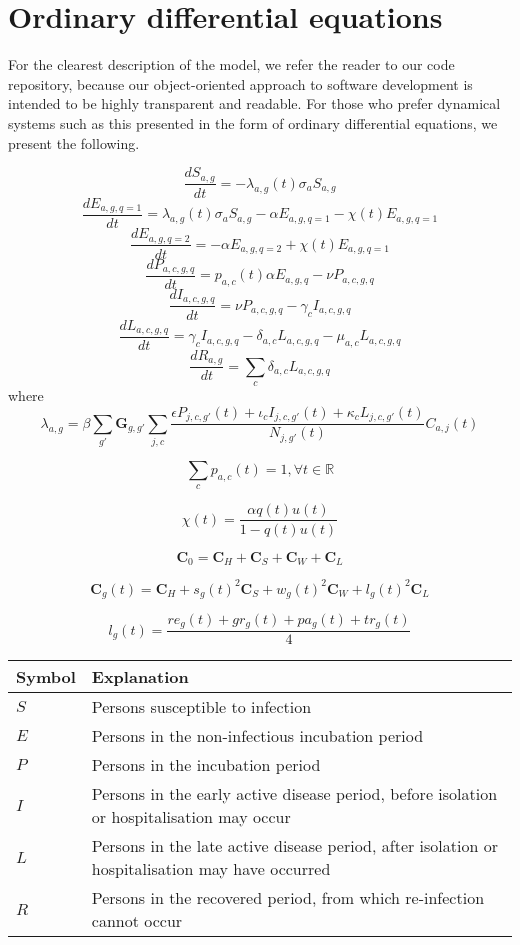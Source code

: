 
\section{Ordinary differential equations}

For the clearest description of the model, we refer the reader to our code repository, because our object-oriented approach to software development is intended to be highly transparent and readable. For those who prefer dynamical systems such as this presented in the form of ordinary differential equations, we present the following.

\[\frac{dS_{a,g}}{dt}=-\lambda_{a,g}(t) \sigma_{a} S_{a,g}\]
\[\frac{dE_{a,g,q=1}}{dt}=\lambda_{a,g}(t) \sigma_{a} S_{a,g} -\alpha E_{a,g,q=1} - \chi(t) E_{a,g,q=1} \]
\[\frac{dE_{a,g,q=2}}{dt}=-\alpha E_{a,g,q=2} + \chi(t) E_{a,g,q=1} \]
\[\frac{dP_{a,c,g,q}}{dt}=p_{a,c}(t) \alpha E_{a,g,q}-\nu P_{a,c,g,q}\]
\[\frac{dI_{a,c,g,q}}{dt}=\nu P_{a,c,g,q}-\gamma_{c}I_{a,c,g,q}\]
\[\frac{dL_{a,c,g,q}}{dt}=\gamma_{c}I_{a,c,g,q}-\delta_{a,c}L_{a,c,g,q}-\mu_{a,c}L_{a,c,g,q}\]
\[\frac{dR_{a,g}}{dt}=\sum_{c}{}\delta_{a,c}L_{a,c,g,q}\]
where
\[\lambda_{a,g}=\beta \sum_{g'}\textbf{G}_{g,g'} \sum_{j,c}\frac{\epsilon P_{j,c,g'}(t)+\iota_{c}I_{j,c,g'}(t)+\kappa_{c}L_{j,c,g'}(t)}{N_{j,g'}(t)} C_{a,j}(t)\]

\[\sum_{c}p_{a,c}(t)=1,\forall t\in\mathbb{R}\]

\[\chi(t) = \frac{\alpha q(t) u(t)}{1 - q(t) u(t)}\]

\[\textbf{C}_{0}=\textbf{C}_{H}+\textbf{C}_{S}+\textbf{C}_{W}+\textbf{C}_{L}\]

\[\textbf{C}_{g}(t)=\textbf{C}_{H}+s_{g}(t)^{2}\textbf{C}_{S}+w_{g}(t)^{2}\textbf{C}_{W}+l_{g}(t)^{2}\textbf{C}_{L}\]

\[l_{g}(t)=\frac{re_{g}(t)+gr_{g}(t)+pa_{g}(t)+tr_{g}(t)}{4}\]

\begin{table}[ht]
\renewcommand{\baselinestretch}{1}
    	\begin{tabular}{| p{2cm} | p{11.1cm} |}
    	\hline
    		Symbol & Explanation \\
	    	\hline
	    	$S$ & Persons susceptible to infection \\
    		$E$ & Persons in the non-infectious incubation period \\
    		$P$ & Persons in the incubation period \\
    		$I$ & Persons in the early active disease period, before isolation or hospitalisation may occur \\
    		$L$ & Persons in the late active disease period, after isolation or hospitalisation may have occurred \\
    		$R$ & Persons in the recovered period, from which re-infection cannot occur \\
    		\hline
	\end{tabular}
\end{table}


